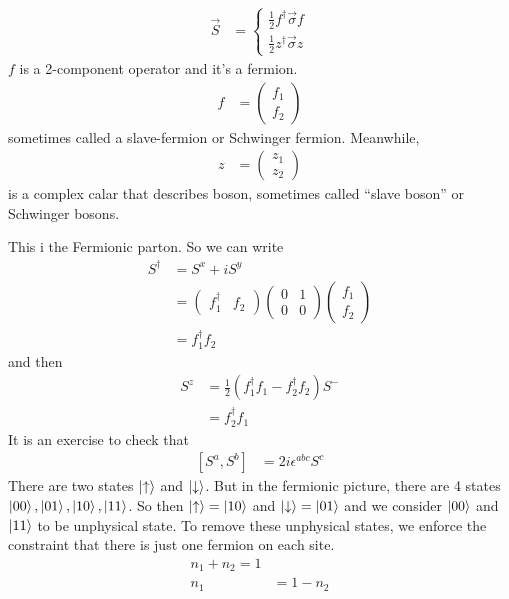 \begin{align}
    \vec{S} &=
    \begin{cases}
        \frac{1}{2}f^\dagger \vec{\sigma} f\\
        \frac{1}{2}z^\dagger \vec{\sigma} z
    \end{cases}
\end{align}
$f$ is a 2-component operator and it's a fermion.
\begin{align}
    f &=
    \begin{pmatrix}
        f_1\\
        f_2
    \end{pmatrix}
\end{align}
sometimes called a slave-fermion or
Schwinger fermion.
Meanwhile,
\begin{align}
    z &=
    \begin{pmatrix}
        z_1\\
        z_2
    \end{pmatrix}
\end{align}
is a complex calar that describes boson,
sometimes called ``slave boson'' or Schwinger bosons.

This i the Fermionic parton.
So we can write
\begin{align}
    S^\dagger &=
    S^x + iS^y\\
    &=
    \begin{pmatrix}
        f_1^\dagger & f_2
    \end{pmatrix}
    \begin{pmatrix}
        0 & 1\\
        0 & 0
    \end{pmatrix}
    \begin{pmatrix}
        f_1\\
        f_2
    \end{pmatrix} \\
    &=
    f_1^\dagger f_2
\end{align}
and then
\begin{align}
    S^z &=
    \frac{1}{2}
    \left( 
    f_1^\dagger f_1
    -
    f_2^\dagger f_2
    \right)
    S^-\\
    &=
    f_2^\dagger f_1
\end{align}
It is an exercise to check that
\begin{align}
    \left[ S^a, S^b \right]
    &=
    2i \epsilon^{abc} S^c
\end{align}
There are two states $\ket{\uparrow}$ and $\ket{\downarrow}$.
But in the fermionic picture,
there are 4 states
$\ket{00}, \ket{01}, \ket{10}, \ket{11}$.
So then $\ket{\uparrow}=\ket{10}$ and $\ket{\downarrow}=\ket{01}$
and we consider $\ket{00}$ and $\ket{11}$ to be unphysical state.
To remove these unphysical states,
we enforce the constraint that there is just one fermion on each site.
\begin{align}
    n_1 + n_2 = 1\\
    n_1 &= 1- n_2
\end{align}

